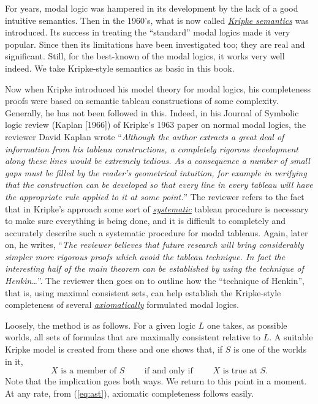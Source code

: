 For years, 
modal logic was hampered in its development by the lack of a good intuitive semantics.
% 
Then in the 1960's, 
what is now called \underline{\textit{Kripke semantics}} was introduced.
% 
Its success in treating the ``standard'' modal logics made it very popular.
% 
Since then its limitations have been investigated too; 
they are real and significant.
% 
% 
Still,
for the best-known of the modal logics, 
it works very well indeed.
% 
We take Kripke-style semantics as basic in this book.




Now when Kripke introduced his model theory for modal logics, 
his completeness proofs were based on semantic tableau constructions of some complexity.
% 
Generally, he
has not been followed in this.
% 
Indeed, in his Journal of Symbolic logic review (Kaplan [1966]) of Kripke's 1963 paper on normal modal logics, 
the reviewer David Kaplan wrote 
``\textit{Although the author extracts a great deal of information from his tableau constructions, 
a completely rigorous development along these lines would be extremely
tedious.
As a consequence a number of small gaps must be filled by the reader's geometrical intuition, 
for example in verifying that the construction can be developed so that
every line in every tableau will have the appropriate rule
applied to it at some point.}''
% 
The reviewer refers to the fact that in Kripke's approach some sort of \underline{\textit{systematic}} tableau procedure is necessary to make sure everything is being done, 
and it is difficult to completely and accurately describe such a systematic procedure for modal tableaus.
% 
Again, later on, he writes, 
``\textit{The reviewer believes that future research will bring considerably simpler more rigorous proofs which avoid the tableau technique.
In fact the interesting half of the main theorem can be established by using the technique of
Henkin\dots}''.
% 
% 
The reviewer then goes on to outline how the ``technique of Henkin'', that is, 
using maximal consistent sets, 
can help establish the Kripke-style completeness of
several \underline{\textit{axiomatically}} formulated modal logics.




Loosely, the method is as follows.
% 
For a given logic $L$ one takes, 
as possible worlds, 
all sets of formulas that are maximally consistent relative to $L$.
% 
A suitable Kripke model is created from these and one shows that, 
if $S$ is one of the worlds in it,
\[
    X \text{~is a member of~} S
    \qquad\text{~if and only if~}\qquad
    X \text{~is true at~} S.
    \tag{$\ast$}    
    \label{eq:ast}
\]
Note that the implication goes both ways.
% 
We return to
this point in a moment.
% 
At any rate, from (\ref{eq:ast}), 
axiomatic completeness follows easily.



